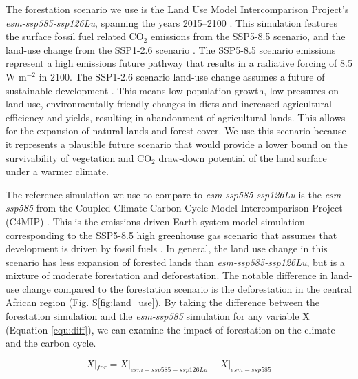 \documentclass[]{article}
\begin{document}
The forestation scenario we use is the Land Use Model Intercomparison Project's \textit{esm-ssp585-ssp126Lu}, spanning the years 2015--2100 \parencite{lawrence_land_2016}.
This simulation features the surface fossil fuel related CO$_{2}$ emissions from the SSP5-8.5 scenario, and the land-use change from the SSP1-2.6 scenario \parencite{oneill_scenario_2016}.
The SSP5-8.5 scenario emissions represent a high emissions future pathway that results in a radiative forcing of 8.5 W m$^{-2}$ in 2100.
The SSP1-2.6 scenario land-use change assumes a future of sustainable development \parencite{van_vuuren_energy_2017}.
This means low population growth, low pressures on land-use, environmentally friendly changes in diets and increased agricultural efficiency and yields, resulting in abandonment of agricultural lands.
This allows for the expansion of natural lands and forest cover.
We use this scenario because it represents a plausible future scenario that would provide a lower bound on the survivability of vegetation and CO$_2$ draw-down potential of the land surface under a warmer climate.

The reference simulation we use to compare to \textit{esm-ssp585-ssp126Lu} is the \textit{esm-ssp585} from the Coupled Climate-Carbon Cycle Model Intercomparison Project (C4MIP) \parencite{jones_c4mip_2016}.
This is the emissions-driven Earth system model simulation corresponding to the SSP5-8.5 high greenhouse gas scenario that assumes that development is driven by fossil fuels \parencite{oneill_scenario_2016}.
In general, the land use change in this scenario has less expansion of forested lands than \textit{esm-ssp585-ssp126Lu}, but is a mixture of moderate forestation and deforestation.
The notable difference in land-use change compared to the forestation scenario is the deforestation in the central African region (Fig. S\ref{fig:land_use}).
By taking the difference between the forestation simulation and the \textit{esm-ssp585} simulation for any variable X (Equation \ref{equ:diff}), we can examine the impact of forestation on the climate and the carbon cycle.

\begin{equation}
    X|_{for} = X|_{esm-ssp585-ssp126Lu} - X|_{esm-ssp585}
    \label{equ:diff}
\end{equation}
\end{document}
